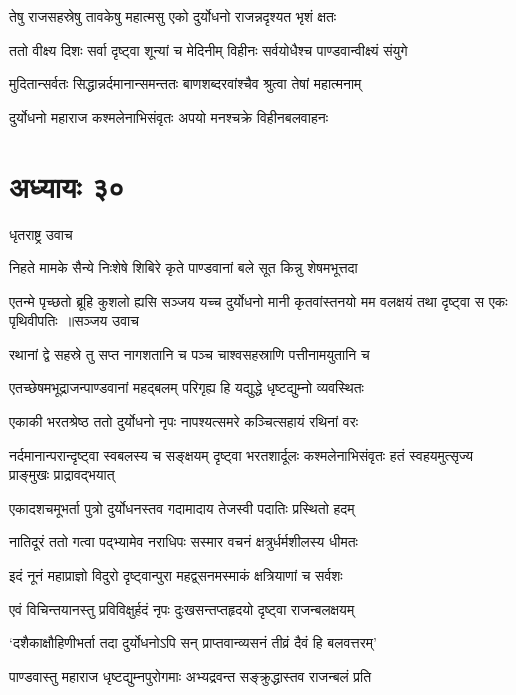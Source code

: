 \twolineshloka
{तेषु राजसहस्रेषु तावकेषु महात्मसु}
{एको दुर्योधनो राजन्नदृश्यत भृशं क्षतः}


\twolineshloka
{ततो वीक्ष्य दिशः सर्वा दृष्ट्वा शून्यां च मेदिनीम्}
{विहीनः सर्वयोधैश्च पाण्डवान्वीक्ष्यं संयुगे}


\twolineshloka
{मुदितान्सर्वतः सिद्धान्नर्दमानान्समन्ततः}
{बाणशब्दरवांश्चैव श्रुत्वा तेषां महात्मनाम्}


\twolineshloka
{दुर्योधनो महाराज कश्मलेनाभिसंवृतः}
{अपयो मनश्चक्रे विहीनबलवाहनः}


\chapter{अध्यायः ३०}
\twolineshloka
{धृतराष्ट्र उवाच}
{}


\twolineshloka
{निहते मामके सैन्ये निःशेषे शिबिरे कृते}
{पाण्डवानां बले सूत किन्नु शेषमभूत्तदा}


\fourlineindentedshloka
{एतन्मे पृच्छतो ब्रूहि कुशलो ह्यसि सञ्जय}
{यच्च दुर्योधनो मानी कृतवांस्तनयो मम}
{वलक्षयं तथा दृष्ट्वा स एकः पृथिवीपतिः ॥सञ्जय उवाच}
{}


\twolineshloka
{रथानां द्वे सहस्रे तु सप्त नागशतानि च}
{पञ्च चाश्वसहस्राणि पत्तीनामयुतानि च}


\twolineshloka
{एतच्छेषमभूद्राजन्पाण्डवानां महद्बलम्}
{परिगृह्य हि यद्युद्धे धृष्टद्युम्नो व्यवस्थितः}


\twolineshloka
{एकाकी भरतश्रेष्ठ ततो दुर्योधनो नृपः}
{नापश्यत्समरे कञ्चित्सहायं रथिनां वरः}


\threelineshloka
{नर्दमानान्परान्दृष्ट्वा स्वबलस्य च सङ्क्षयम्}
{दृष्ट्वा भरतशार्दूलः कश्मलेनाभिसंवृतः}
{हतं स्वहयमुत्सृज्य प्राङ्मुखः प्राद्रावद्भयात्}


\twolineshloka
{एकादशचमूभर्ता पुत्रो दुर्योधनस्तव}
{गदामादाय तेजस्वी पदातिः प्रस्थितो हदम्}


\twolineshloka
{नातिदूरं ततो गत्वा पद्भ्यामेव नराधिपः}
{सस्मार वचनं क्षत्रुर्धर्मशीलस्य धीमतः}


\twolineshloka
{इदं नूनं महाप्राज्ञो विदुरो दृष्ट्वान्पुरा}
{महद्व्सनमस्माकं क्षत्रियाणां च सर्वशः}


\twolineshloka
{एवं विचिन्तयानस्तु प्रविविक्षुर्हदं नृपः}
{दुःखसन्तप्तहृदयो दृष्ट्वा राजन्बलक्षयम्}


\twolineshloka
{`दशैकाक्षौहिणीभर्ता तदा दुर्योधनोऽपि सन्}
{प्राप्तवान्व्यसनं तीव्रं दैवं हि बलवत्तरम्'}


\twolineshloka
{पाण्डवास्तु महाराज धृष्टद्युम्नपुरोगमाः}
{अभ्यद्रवन्त सङ्क्रुद्धास्तव राजन्बलं प्रति}


